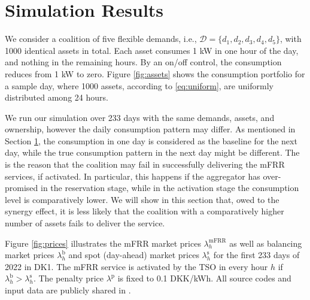 \documentclass[conference]{IEEEtran}
\begin{document}
\section{Simulation Results}\label{chapter3}
%


We consider a coalition of five flexible demands, i.e., $\mathcal{D}=\{d_1, d_2, d_3, d_4, d_5\}$, with 1000 identical assets in total. Each asset consumes 1 kW in one hour of the day, and nothing in the remaining hours. By an on/off control, the consumption reduces from 1 kW to zero. Figure \ref{fig:assets} shows the consumption portfolio for a sample day, where 1000 assets, according to \eqref{eq:uniform}, are uniformly distributed among 24 hours.

We run our simulation over 233 days with the same demands, assets, and ownership, however the daily consumption pattern may differ. As mentioned in Section \ref{chapter3}, the consumption in one day is considered as the baseline for the next day, while the true consumption pattern in the next day might be different. The is the reason that the coalition may fail in successfully delivering the mFRR services, if activated. In particular, this happens if the aggregator has over-promised in the reservation stage, while in the activation stage the consumption level is comparatively lower. We will show in this section that, owed to the synergy effect, it is less likely that the coalition with a comparatively higher number of assets fails to deliver the service.

Figure \ref{fig:prices} illustrates the mFRR market prices $\lambda^{\text{mFRR}}_h$ as well as balancing market prices $\lambda^{\text{b}}_h$ and spot (day-ahead) market prices $\lambda^{\text{s}}_h$ for the first 233 days of 2022 in DK1. The mFRR service is activated by the TSO in every hour $h$ if $\lambda^{\text{b}}_h > \lambda^{\text{s}}_h$.
The penalty price $\lambda^{\text{p}}$ is fixed to 0.1 DKK/kWh. All source codes and input data are
publicly shared in \cite{code}.
\end{document}

